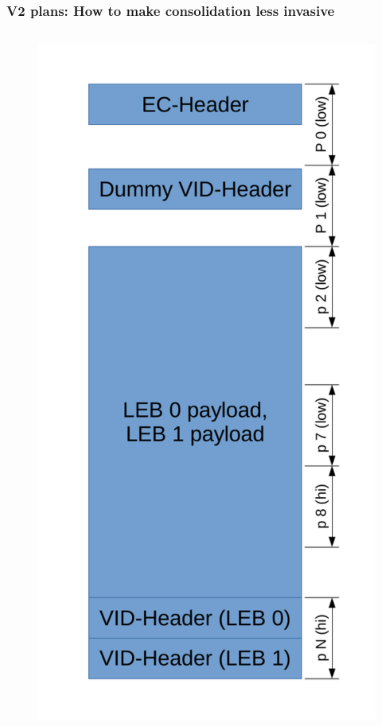 \documentclass[aspectratio=169,obeyspaces,spaces,hyphens,dvipsnames]{beamer}
\begin{document}
\begin{frame}[fragile]
\frametitle{V2 plans: How to make consolidation less invasive}
   \begin{columns}
     \begin{figure}
     \includegraphics[scale=0.33]{ubi_mlc_conso_dummy.pdf}

\end{figure}
\end{columns}
\end{frame}
\end{document}
